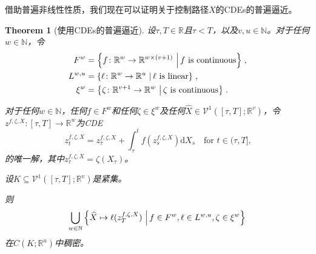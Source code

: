 \documentclass{ctexart}
\theoremstyle{plain}
\newtheorem{thm}{Theorem}[section]
\theoremstyle{definition}
\newcommand{\reals}{\mathbb{R}}
\newcommand{\naturals}{\mathbb{N}}
\newcommand{\set}[2]{\left\{{#1}\,\left\vert\,{#2}\vphantom{{#1}}\right\}\right.}
\begin{document}
借助普遍非线性性质，我们现在可以证明关于控制路径$X$的CDEs的普遍逼近。
\begin{thm}[使用CDEs的普遍逼近]\label{prop:pathwise-universal-approximation}
设$\tau, T \in \reals$且$\tau < T$，以及$v, u \in \naturals$。对于任何$w \in \naturals$，令
\begin{align*}
	F^w &= \set{f \colon \reals^w \to \reals^{w \times (v + 1)}}{f \text{ is continuous}},\\
	L^{w, u} &= \set{\ell \colon \reals^w \to \reals^u}{\ell \text{ is linear}},\\
	\xi^w&= \set{\zeta \colon \reals^{v + 1} \to \reals^w}{\zeta \text{ is continuous}}.
\end{align*}

对于任何$w \in \naturals$，任何$f \in F^w$和任何$\zeta \in \xi^w$及任何$\widehat{X} \in \mathcal{V}^1([\tau, T]; \reals^v)$，令$z^{f, \zeta, X} \colon [\tau, T] \to \reals^w$为CDE
\begin{equation*}
	z^{f, \zeta, X}_t = z^{f, \zeta, X}_\tau + \int_\tau^t f(z^{f, \zeta, X}_s) \mathrm{d}X_s\quad\text{for $t \in (\tau, T]$,}
\end{equation*}
的唯一解，其中$z^{f, \zeta, X}_\tau = \zeta(X_\tau)$。

设$K \subseteq \mathcal{V}^1([\tau, T]; \reals^v)$是紧集。

则
\begin{equation*}
	\bigcup_{w \in \naturals} \set{\widehat{X} \mapsto \ell(z^{f, \zeta, X}_T)}{f \in F^w, \ell \in L^{w, u}, \zeta \in \xi^w}
\end{equation*}
在$C(K; \reals^u)$中稠密。
\end{thm}
\end{document}
